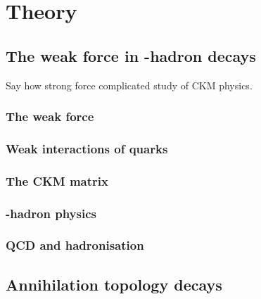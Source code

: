 \chapter{Theory} 
\label{ch:theory}

\minitoc





\section{The weak force in \bquark-hadron decays}
Say how strong force complicated study of CKM physics.

\subsection{The weak force}
\subsection{Weak interactions of quarks}
\subsection{The CKM matrix}
\subsection{\bquark-hadron physics}
\subsection{QCD and hadronisation}



\section{Annihilation topology decays}

